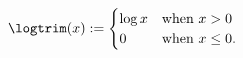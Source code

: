 \begin{defn}
%
\begin{align*}
%
\logtrim(x) :=
\begin{cases}
    \log x  &\textrm{when }x > 0 \\
    0       &\textrm{when }x \le 0.
\end{cases}
%
\end{align*}
%
%
%
\end{defn}


















